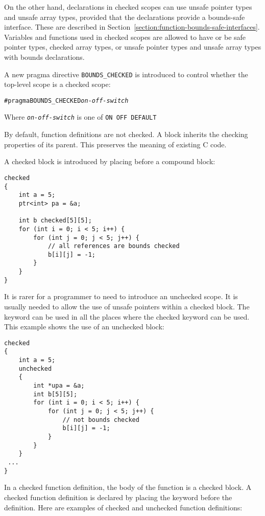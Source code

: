 On the other hand,  declarations in checked scopes can use unsafe pointer 
types and unsafe array types, provided that the declarations provide a 
bounds-safe interface.   These are described in
Section~\ref{section:function-bounds-safe-interfaces}.
Variables and functions used in checked scopes are 
allowed to have or be safe pointer types, checked array types, or unsafe pointer types
and unsafe array types with bounds declarations. 

A new pragma directive \texttt{BOUNDS\_CHECKED} is introduced to control whether
the top-level scope is a checked scope:
\begin{alltt}
#pragma BOUNDS_CHECKED \textit{on-off-switch}
\end{alltt}

Where \texttt{\textit{on-off-switch}} is one of \verb|ON OFF DEFAULT|

By default, function definitions are not checked. A block inherits the
checking properties of its parent. This preserves the meaning of
existing C code.

A checked block is introduced by placing   before a
compound block:
\begin{verbatim}
checked 
{
    int a = 5;
    ptr<int> pa = &a;

    int b checked[5][5];
    for (int i = 0; i < 5; i++) {
        for (int j = 0; j < 5; j++) {
            // all references are bounds checked
            b[i][j] = -1;
        }
    }
}
\end{verbatim}

It is rarer for a programmer to need to introduce an unchecked scope. It
is usually needed to allow the use of unsafe pointers within a checked
block. The  keyword can be used in all the places where the
checked keyword can be used. This example shows the use of an unchecked
block:

\begin{verbatim}
checked 
{
    int a = 5;
    unchecked 
    {
        int *upa = &a;	
        int b[5][5];
        for (int i = 0; i < 5; i++) {
            for (int j = 0; j < 5; j++) {
                // not bounds checked
                b[i][j] = -1;
            }
        }     
    }
 ...
}
\end{verbatim}

In a checked function definition, the body of the function is a 
checked  block. A checked function definition is declared by placing the
 keyword before the definition. Here are examples of checked and
unchecked function definitions:

